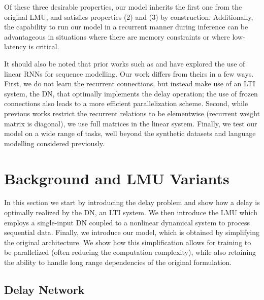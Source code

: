 \documentclass{article}
\begin{document}
Of these three desirable properties, our model inherits the first one from the original LMU, and satisfies properties (2) and (3) by construction. Additionally, the capability to run our model in a recurrent manner during inference can be advantageous in situations where there are memory constraints or where low-latency is critical. 

It should also be noted that prior works such as \citet{balduzzi2016strongly} and \citet{martin2017parallelizing}  have explored the use of linear RNNs for sequence modelling. Our work differs from theirs in a few ways. First, we do not learn the recurrent connections, but instead make use of an LTI system, the DN, that optimally implements the delay operation; the use of frozen connections also leads to a more efficient parallelization scheme.  Second, while previous works restrict the recurrent relations to be elementwise (recurrent weight matrix is diagonal), we use full matrices in the linear system. Finally, we test our model on a wide range of tasks, well beyond the synthetic datasets \citep{martin2017parallelizing} and language modelling \citep{balduzzi2016strongly} considered previously.

\section{Background and LMU Variants}

In this section we start by introducing the delay problem and show how a delay is optimally realized by the DN, an LTI system. We then introduce the LMU which employs a single-input DN coupled to a nonlinear dynamical system to process sequential data. Finally, we introduce our model, which is obtained by simplifying the original architecture. We show how this simplification allows for training to be parallelized (often reducing the computation complexity), while also retaining the ability to handle long range dependencies of the original formulation. 



\subsection{Delay Network}
\end{document}
